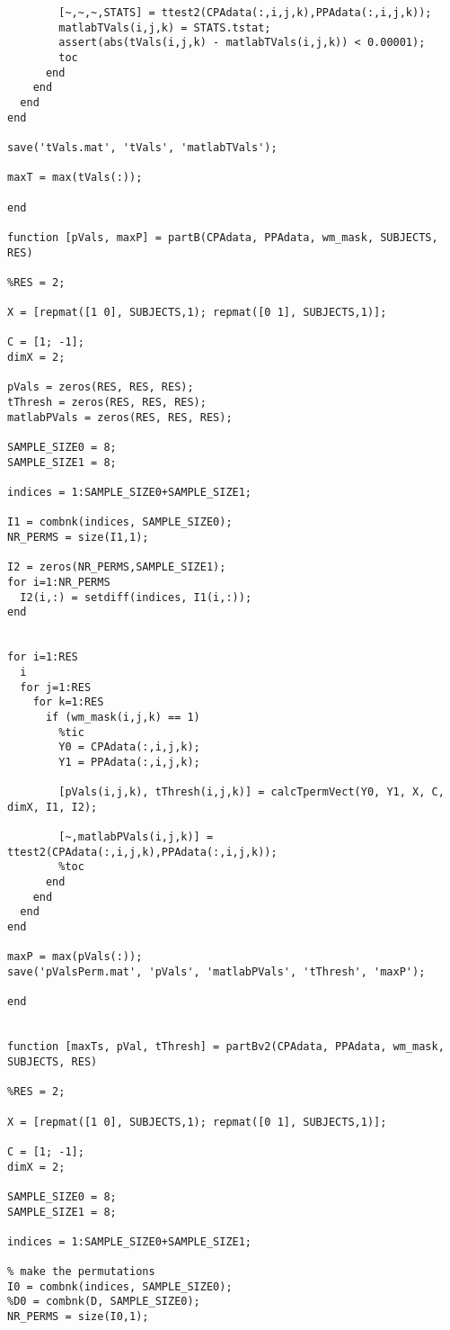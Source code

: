 \documentclass[11pt,a4paper,oneside]{report}
\begin{document}
\begin{lstlisting}
        [~,~,~,STATS] = ttest2(CPAdata(:,i,j,k),PPAdata(:,i,j,k));
        matlabTVals(i,j,k) = STATS.tstat;
        assert(abs(tVals(i,j,k) - matlabTVals(i,j,k)) < 0.00001);
        toc
      end
    end
  end
end

save('tVals.mat', 'tVals', 'matlabTVals');

maxT = max(tVals(:));

end

function [pVals, maxP] = partB(CPAdata, PPAdata, wm_mask, SUBJECTS, RES)

%RES = 2;

X = [repmat([1 0], SUBJECTS,1); repmat([0 1], SUBJECTS,1)];

C = [1; -1];
dimX = 2;

pVals = zeros(RES, RES, RES);
tThresh = zeros(RES, RES, RES);
matlabPVals = zeros(RES, RES, RES);

SAMPLE_SIZE0 = 8;
SAMPLE_SIZE1 = 8;

indices = 1:SAMPLE_SIZE0+SAMPLE_SIZE1;

I1 = combnk(indices, SAMPLE_SIZE0);
NR_PERMS = size(I1,1);

I2 = zeros(NR_PERMS,SAMPLE_SIZE1);
for i=1:NR_PERMS
  I2(i,:) = setdiff(indices, I1(i,:));
end


for i=1:RES
  i
  for j=1:RES
    for k=1:RES
      if (wm_mask(i,j,k) == 1)
        %tic
        Y0 = CPAdata(:,i,j,k);
        Y1 = PPAdata(:,i,j,k);
        
        [pVals(i,j,k), tThresh(i,j,k)] = calcTpermVect(Y0, Y1, X, C, dimX, I1, I2);

        [~,matlabPVals(i,j,k)] = ttest2(CPAdata(:,i,j,k),PPAdata(:,i,j,k));
        %toc
      end
    end
  end
end

maxP = max(pVals(:));
save('pValsPerm.mat', 'pVals', 'matlabPVals', 'tThresh', 'maxP');

end


function [maxTs, pVal, tThresh] = partBv2(CPAdata, PPAdata, wm_mask, SUBJECTS, RES)

%RES = 2;

X = [repmat([1 0], SUBJECTS,1); repmat([0 1], SUBJECTS,1)];

C = [1; -1];
dimX = 2;

SAMPLE_SIZE0 = 8;
SAMPLE_SIZE1 = 8;

indices = 1:SAMPLE_SIZE0+SAMPLE_SIZE1;

% make the permutations
I0 = combnk(indices, SAMPLE_SIZE0);
%D0 = combnk(D, SAMPLE_SIZE0);
NR_PERMS = size(I0,1);


\end{lstlisting}
\end{document}
